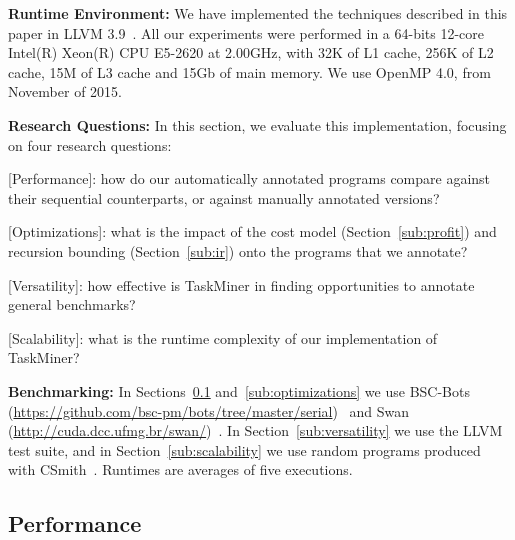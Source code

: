 \documentclass[sigplan,10pt,screen]{acmart}
\newcommand\Taskminer{\mbox{\textsf{TaskMiner}}}
\begin{document}
\noindent
\textbf{Runtime Environment:}
We have implemented the techniques described in this paper in
LLVM 3.9~\cite{Lattner04}.
All our experiments were performed in a 64-bits 12-core Intel(R) Xeon(R) CPU
E5-2620 at 2.00GHz, with 32K of L1 cache, 256K of L2 cache, 15M of L3 cache and
15Gb of main memory.
We use OpenMP 4.0, from November of 2015.

\noindent
\textbf{Research Questions:}
In this section, we evaluate this implementation, focusing on four research
questions:
%
\begin{compactitem}
\item \textsf{[Performance]}: how do our automatically annotated programs
compare against their sequential counterparts, or against manually annotated
versions?
\item \textsf{[Optimizations]}: what is the impact of the cost model
(Section~\ref{sub:profit}) and recursion bounding (Section~\ref{sub:ir}) onto
the programs that we annotate?
\item \textsf{[Versatility]}: how effective is \Taskminer{} in finding
opportunities to annotate general benchmarks?
\item \textsf{[Scalability]}: what is the runtime complexity of our
implementation of \Taskminer?
\end{compactitem}

\noindent
\textbf{Benchmarking:}
In Sections~\ref{sub:performance} and~\ref{sub:optimizations} we use
\textsf{BSC-Bots} (\url{https://github.com/bsc-pm/bots/tree/master/serial})~\cite{Duran09} and
\textsf{Swan} (\url{http://cuda.dcc.ufmg.br/swan/})~\cite{Moreira17}.
In Section~\ref{sub:versatility} we use the LLVM test suite, and in
Section~\ref{sub:scalability} we use random programs produced with
\textsf{CSmith}~\cite{Yang11}.
Runtimes are averages of five executions.

\subsection{Performance}
\label{sub:performance}
\end{document}
